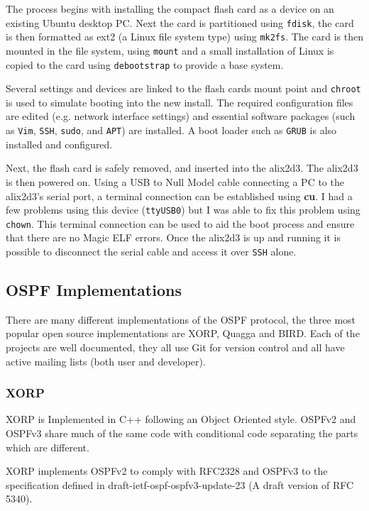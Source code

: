 \documentclass[12pt]{report}
\begin{document}
The process begins with installing the compact flash card as a device on an
existing Ubuntu desktop PC. Next the card is partitioned using \texttt{fdisk},
the card is then formatted as ext2 (a Linux file system type) using
\texttt{mk2fs}. The card is then mounted in the file system, using
\texttt{mount} and a small installation of Linux is copied to the card using
\texttt{debootstrap} to provide a base system.  

Several settings and devices are linked to the flash cards mount point and
\texttt{chroot} is used to simulate booting into the new install. The required
configuration files are edited (e.g. network interface settings) and essential
software packages (such as \texttt{Vim}, \texttt{SSH}, \texttt{sudo}, and
\texttt{APT}) are installed. A boot loader such as \texttt{GRUB} is also
installed and configured. 

Next, the flash card is safely removed, and  inserted into the alix2d3. The
alix2d3 is then powered on. Using a USB to Null Model cable connecting a PC to
the alix2d3's serial port, a terminal connection can be established using {\bf
cu}. I had a few problems using this device (\texttt{ttyUSB0}) but I was able to
fix this problem using \texttt{chown}. This terminal connection can be used to
aid the boot process and ensure that there are no Magic ELF errors. Once the
alix2d3 is up and running it is possible to disconnect the serial cable and
access it over \texttt{SSH} alone. 

\subsection{OSPF Implementations}
There are many different implementations of the OSPF protocol, the three most
popular open source implementations are XORP, Quagga and BIRD. Each of the
projects are well documented, they all use Git for version control and all have
active mailing lists (both user and developer).

\subsubsection{XORP}
XORP\cite{XORPHome} is Implemented in C++ following an Object Oriented style. OSPFv2 and OSPFv3
share much of the same code with conditional code separating the parts which are
different.

XORP implements OSPFv2 to comply with RFC2328 and OSPFv3 to the specification
defined in draft-ietf-ospf-ospfv3-update-23 (A draft version of RFC 5340).
\end{document}
